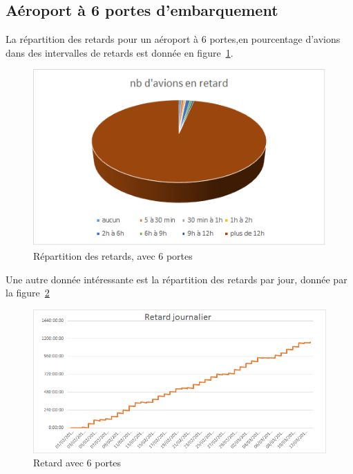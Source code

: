 \begin{table}[h]
 \subsection{Aéroport à 6 portes d'embarquement}
La répartition des retards pour un aéroport à 6 portes,en pourcentage d'avions dans des intervalles de retards est donnée en figure~\ref{retard_camenbert_6}.
  \graphicspath{{donnees/graph_90jours/6portes/}}
    \begin{figure}[h!]
 \includegraphics[scale=0.6]{retard_avions.bmp}
  \caption{\label{retard_camenbert_6} Répartition des retards, avec 6 portes} 
 \end{figure}
 
 Une autre donnée intéressante est la répartition des retards par jour, donnée par la figure~\ref{retard_jour_6}
   \begin{figure}[h!]
 \includegraphics{retard_jour.bmp}
  \caption{\label{retard_jour_6} Retard avec 6 portes} 
 \end{figure}
 

\end{table}
